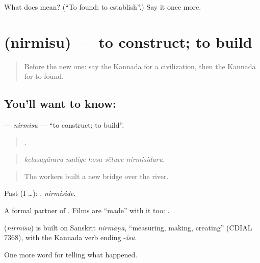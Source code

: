 \begin{tcolorbox}[breakable,colback=teal!4,colframe=teal!35!black,title={Before you move on}]
What does  mean? (\textquotedblleft{}To found; to establish\textquotedblright{}.) Say it once more.
\end{tcolorbox}
\section[\texorpdfstring{\kn{ನಿರ್ಮಿಸು} (nirmisu)}{ನಿರ್ಮಿಸು (nirmisu)}]{ (nirmisu) — to construct; to build}

\label{lesson:KA-C362-nirmisu}



\begin{quote}
Before the new one: say the Kannada for a civilization, then the Kannada for to found.
\end{quote}

\subsection*{You'll want to know: }
\textbf{} — \emph{nirmisu} — \textquotedblleft{}to construct; to build\textquotedblright{}.

\begin{quote}
    .
\end{quote}

\begin{quote}
\emph{kelasagāraru nadige hosa sētuve nirmisidaru.}
\end{quote}

\begin{quote}
The workers built a new bridge over the river.
\end{quote}

Past (I …): , \emph{nirmiside}.

A formal partner of . Films are \textquotedblleft{}made\textquotedblright{} with it too:  .

\begin{cousinweb}
\textbf{} (\emph{nirmisu}) is built on Sanskrit \emph{nirmāṇa}, \textquotedblleft{}measuring, making, creating\textquotedblright{} (CDIAL 7368), with the Kannada verb ending -\emph{isu}.
\end{cousinweb}

\begin{grammarlens}[title={What you've built}]
One more word for telling what happened.
\end{grammarlens}

